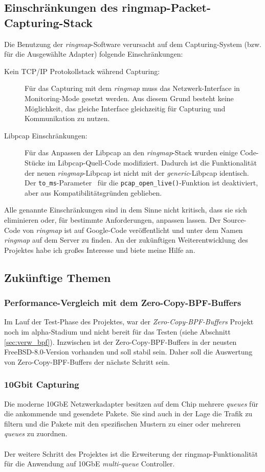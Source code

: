 \subsection{Einschränkungen des ringmap-Packet-Capturing-Stack}\label{sec:einschr}
Die Benutzung der \emph{ringmap}-Software verursacht auf dem Capturing-System
(bzw. für die Ausgewählte Adapter) folgende Einschränkungen:
\begin{description}
	\item [Kein TCP/IP Protokollstack während Capturing:] Für das 
		Capturing mit dem \emph{ringmap} muss das Netzwerk-Interface in
		Monitoring-Mode gesetzt werden. Aus diesem Grund besteht keine 
		Möglichkeit, das gleiche Interface gleichzeitig für Capturing 
		und Kommunikation zu nutzen.
	\item [Libpcap Einschränkungen:] Für das Anpassen der Libpcap an den
		\emph{ringmap}-Stack wurden einige Code-Stücke im Libpcap-Quell-Code
		modifiziert. Dadurch ist die Funktionalität der neuen
		\emph{ringmap}-Libpcap ist nicht mit der \emph{generic}-Libpcap
		identisch. Der \verb+to_ms+-Parameter~\cite{man_pcap} für die
		\verb+pcap_open_live()+-Funktion ist deaktiviert, aber aus
		Kompatibilitätsgründen geblieben.
\end{description}
Alle genannte Einschränkungen sind  in dem Sinne nicht kritisch, dass 
sie sich eliminieren oder, für bestimmte Anforderungen, anpassen lassen. 
Der Source-Code von \emph{ringmap} ist auf Google-Code veröffentlicht 
und unter dem Namen \emph{ringmap} auf dem Server zu finden. An der  zukünftigen 
Weiterentwicklung des Projektes habe ich großes Interesse und biete meine Hilfe an.

\subsection{Zukünftige Themen}
\subsubsection{Performance-Vergleich mit dem Zero-Copy-BPF-Buffers}
Im Lauf der Test-Phase des Projektes, war der \emph{Zero-Copy-BPF-Buffers}
Projekt noch im alpha-Stadium und nicht bereit für das Testen (siehe Abschnitt
\ref{sec:verw_bpf}). Inzwischen ist der Zero-Copy-BPF-Buffers in der neusten
FreeBSD-8.0-Version vorhanden und soll stabil sein. Daher soll die Auswertung 
von Zero-Copy-BPF-Buffers der nächste Schritt sein.
\subsubsection{10Gbit Capturing}
Die moderne 10GbE Netzwerkadapter besitzen auf dem Chip mehrere \emph{queues} für die
ankommende und gesendete Pakete. Sie sind auch in der Lage die Trafik zu filtern und 
die Pakete mit den spezifischen Mustern zu einer oder mehreren \emph{queues} zu zuordnen.\\\\
%
Der weitere Schritt des Projektes ist die Erweiterung der ringmap-Funktionalität für die Anwendung 
auf 10GbE \emph{multi-queue} Controller.
